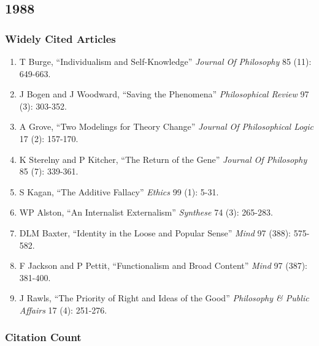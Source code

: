 \documentclass[
  10pt,
  letterpaper,
  DIV=11,
  numbers=noendperiod,
  twoside]{scrartcl}
\providecommand{\tightlist}{%
  \setlength{\itemsep}{0pt}\setlength{\parskip}{0pt}}\usepackage{longtable,booktabs,array}
\begin{document}
\newpage

\subsection{1988}\label{section-12}

\subsubsection*{Widely Cited Articles}\label{widely-cited-articles-12}

\begin{enumerate}
\def\labelenumi{\arabic{enumi}.}
\tightlist
\item
  T Burge, ``Individualism and Self-Knowledge'' \emph{Journal Of
  Philosophy} 85 (11): 649-663.
\item
  J Bogen and J Woodward, ``Saving the Phenomena'' \emph{Philosophical
  Review} 97 (3): 303-352.
\item
  A Grove, ``Two Modelings for Theory Change'' \emph{Journal Of
  Philosophical Logic} 17 (2): 157-170.
\item
  K Sterelny and P Kitcher, ``The Return of the Gene'' \emph{Journal Of
  Philosophy} 85 (7): 339-361.
\item
  S Kagan, ``The Additive Fallacy'' \emph{Ethics} 99 (1): 5-31.
\item
  WP Alston, ``An Internalist Externalism'' \emph{Synthese} 74 (3):
  265-283.
\item
  DLM Baxter, ``Identity in the Loose and Popular Sense'' \emph{Mind} 97
  (388): 575-582.
\item
  F Jackson and P Pettit, ``Functionalism and Broad Content''
  \emph{Mind} 97 (387): 381-400.
\item
  J Rawls, ``The Priority of Right and Ideas of the Good''
  \emph{Philosophy \& Public Affairs} 17 (4): 251-276.
\end{enumerate}

\subsubsection*{Citation Count}\label{citation-count-12}
\end{document}

